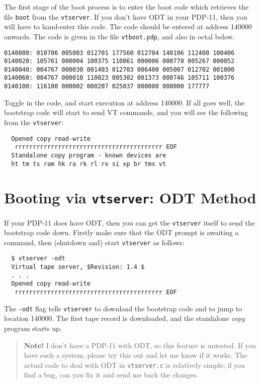 The first stage of the boot process is to enter the boot code which
retrieves the file {\tt boot} from the {\tt vtserver}. If you don't
have ODT in your PDP-11, then you will have to hand-enter this code.
The code should be entered at address 140000 onwards. The code is given in
the file {\tt vtboot.pdp}, and also in octal below.

\begin{verbatim}
0140000: 010706 005003 012701 177560 012704 140106 112400 100406
0140020: 105761 000004 100375 110061 000006 000770 005267 000052
0140040: 004767 000030 001403 012703 006400 005007 012702 001000
0140060: 004767 000010 110023 005302 001373 000746 105711 100376
0140100: 116100 000002 000207 025037 000000 000000 177777
\end{verbatim}

Toggle in the code, and start execution at address 140000. If all goes well,
the bootstrap code will start to send VT commands, and you will see the
following from the {\tt vtserver}:

\begin{verbatim}
  Opened copy read-write
   rrrrrrrrrrrrrrrrrrrrrrrrrrrrrrrrrrrrrrrrr EOF
  Standalone copy program - known devices are 
  ht tm ts ram hk ra rk rl rx si xp br tms vt 
\end{verbatim}

\section{Booting via {\tt vtserver}: ODT Method}

If your PDP-11 does have ODT, then you can get the {\tt vtserver} itself to
send the bootstrap code down. Firstly make sure that the ODT prompt is
awaiting a command, then (shutdown and) start {\tt vtserver} as follows:

\begin{verbatim}
  $ vtserver -odt
  Virtual tape server, $Revision: 1.4 $ 
  . . .
  Opened copy read-write
   rrrrrrrrrrrrrrrrrrrrrrrrrrrrrrrrrrrrrrrrr EOF
\end{verbatim}

The {\tt -odt} flag tells {\tt vtserver} to download the bootstrap code
and to jump to location 140000. The first tape record is downloaded,
and the standalone {\it copy} program starts up.

\begin{quote}
{\bf Note!} I don't have a PDP-11 with ODT, so this feature is untested.
If you have such a system, please try this out and let me know if it
works. The actual code to deal with ODT in {\tt vtserver.c} is relatively
simple; if you find a bug, can you fix it and send me back the changes.
\end{quote}


